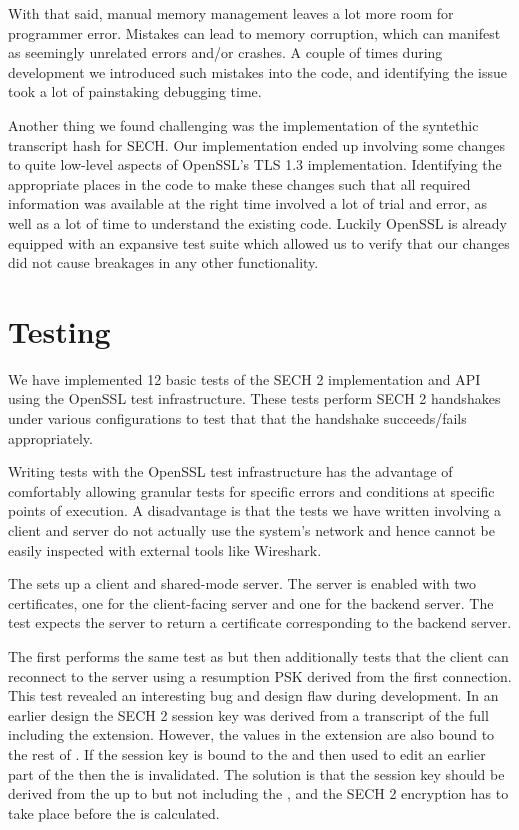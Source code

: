 With that said, manual memory management leaves a lot more room for programmer error.
Mistakes can lead to memory corruption,
which can manifest as seemingly unrelated errors and/or crashes.
A couple of times during development we introduced such mistakes into the code,
and identifying the issue took a lot of painstaking debugging time.

Another thing we found challenging was the implementation
of the syntethic transcript hash for \ac{SECH}.
Our implementation ended up involving some changes to
quite low-level aspects of OpenSSL's \ac{TLS} 1.3 implementation.
Identifying the appropriate places in the code to make these changes
such that all required information was available at the right time
involved a lot of trial and error, as well as a lot of time to
understand the existing code.
Luckily OpenSSL is already equipped with an expansive test suite
which allowed us to verify that our changes did not cause breakages in any
other functionality.

\section{Testing}

We have implemented 12 basic tests of the \ac{SECH} 2 implementation and \ac{API} using the OpenSSL test infrastructure.
These tests perform \ac{SECH} 2 handshakes under various configurations to test that that the handshake succeeds/fails appropriately.

Writing tests with the OpenSSL test infrastructure has the advantage of comfortably allowing granular tests for specific errors and conditions at specific points of execution.
A disadvantage is that the tests we have written involving a client and server do not actually use the system's network and hence cannot be easily inspected with external tools like Wireshark.

The  sets up a client and shared-mode server.
The server is enabled with two certificates, one for the client-facing server and one for the backend server.
The test expects the server to return a certificate corresponding to the backend server.

The  first performs the same test as  but then additionally tests that the client can reconnect to the server using a resumption \ac{PSK} derived from the first connection. This test revealed an interesting bug and design flaw during development. In an earlier design the \ac{SECH} 2 session key was derived from a transcript of the full  including the  extension. However, the  values in the  extension are also bound to the rest of . If the session key is bound to the  and then used to edit an earlier part of the  then the  is invalidated. The solution is that the session key should be derived from the  up to but not including the , and the \ac{SECH} 2 encryption has to take place before the  is calculated.


